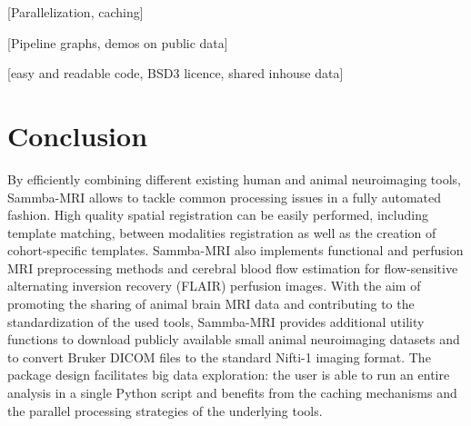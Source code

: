 \documentclass[utf8, a4paper, final, crop]{frontiersSCNS} %
\begin{document}
[Parallelization, caching]

[Pipeline graphs, demos on public data]

[easy and readable code, BSD3 licence, shared inhouse data]

\section{Conclusion}

By efficiently combining different existing human and animal neuroimaging tools, Sammba-MRI
allows to tackle common processing issues in a fully automated fashion. High quality spatial
registration can be easily performed, including template matching, between modalities
registration as well as the creation of cohort-specific templates. Sammba-MRI also implements
functional and perfusion MRI preprocessing methods and cerebral blood flow estimation for
flow-sensitive alternating inversion recovery (FLAIR) perfusion images.
With the aim of promoting the sharing of animal brain MRI data and contributing to the
standardization of the used tools, Sammba-MRI provides additional utility functions to download
publicly available small animal neuroimaging datasets and to convert Bruker DICOM files to
the standard Nifti-1 imaging format.
The package design facilitates big data exploration: the user is able to run an entire analysis in
a single Python script and benefits from the caching mechanisms and the parallel processing
strategies of the underlying tools.
%
\end{document}
